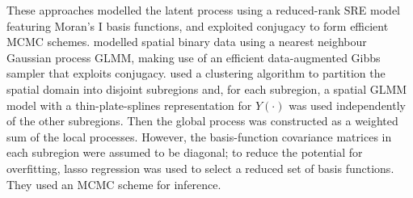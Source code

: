 \documentclass[nojss]{jss}
\begin{document}
 These approaches modelled the latent process using a reduced-rank SRE model featuring Moran's I basis functions, and exploited conjugacy to form efficient MCMC schemes. 
 \cite{Finley_2020_spNNGP} modelled spatial binary data using a nearest neighbour Gaussian process \citep[NNGP; ][]{Datta_2016_NNGP_spatial} GLMM, making use of an efficient data-augmented Gibbs sampler that exploits conjugacy. %
\cite{Lee_2020_partitioned_domain_basis_function_non_Gaussian} used a clustering algorithm to partition the spatial domain into disjoint subregions and, for each subregion, a spatial GLMM model with a thin-plate-splines representation for $Y(\cdot)$ was used independently of the other subregions. 
 Then the global process was constructed as a weighted sum of the local processes. However, the basis-function covariance matrices in each subregion were assumed to be diagonal; to reduce the potential for overfitting, lasso regression was used to select a reduced set of basis functions. They used an MCMC scheme for inference. 

\end{document}
